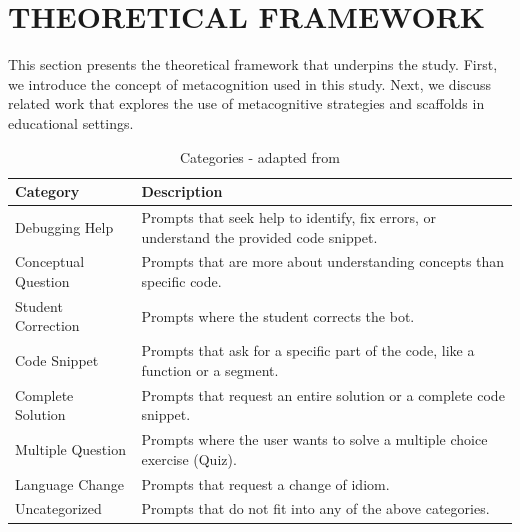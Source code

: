 \documentclass[a4paper,twoside]{article}
\begin{document}

\section{\uppercase{Theoretical Framework}}

This section presents the theoretical framework that underpins the study. First,
we introduce the concept of metacognition used in this study. Next, we discuss
related work that explores the use of metacognitive strategies and scaffolds
in educational settings.

\begin{table}[htbp]
  \caption{Categories - adapted from \cite{Ghimire24}}
  \begin{center}
    \renewcommand{\arraystretch}{1.6} %
    \begin{tabular}{p{3cm} p{12cm}} %
      \hline
      \textbf{Category} & \textbf{Description} \\
      \hline
      Debugging Help & Prompts that seek help to identify, fix errors, or understand the provided code snippet. \\
      Conceptual Question & Prompts that are more about understanding concepts than specific code. \\
      Student Correction & Prompts where the student corrects the bot. \\
      Code Snippet & Prompts that ask for a specific part of the code, like a function or a segment. \\
      Complete Solution & Prompts that request an entire solution or a complete code snippet. \\
      Multiple Question & Prompts where the user wants to solve a multiple choice exercise (Quiz). \\
      Language Change & Prompts that request a change of idiom. \\
      Uncategorized & Prompts that do not fit into any of the above categories. \\
      \hline
    \end{tabular}
    \label{tab:categories}
  \end{center}
\end{table}
\end{document}
